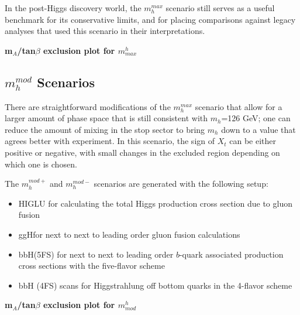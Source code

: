 In the post-Higgs discovery world, the $m_h^{max}$ scenario still serves as a useful
benchmark for its conservative limits, and for placing comparisons against legacy analyses
that used this scenario in their interpretations.   

\textbf{m$_A$/tan$\beta$ exclusion plot for $m^h_{max}$}


\subsection{$m_h^{mod}$ Scenarios}
There are straightforward modifications of the $m_h^{max}$ scenario that allow for 
a larger amount of phase space that is still consistent with $m_h$=126 GeV; one
can reduce the amount of mixing in the stop sector to bring $m_h$ down to a value
that agrees better with experiment.  In this scenario, the sign of $X_t$ can be either
positive or negative, with small changes in the excluded region depending on 
which one is chosen.

The $m_h^{mod+}$ and $m_h^{mod-}$ scenarios are generated with the following setup:
\begin{itemize}
    \item HIGLU for calculating the total Higgs production cross section due to gluon fusion \cite{higlu}
    \item ggH\@NNLO for next to next to leading order gluon fusion calculations \cite{gghnnlo} 
    \item bbH\@NNLO (5FS) for next to next to leading order $b$-quark associated production cross sections with the five-flavor scheme \cite{bbhnnlo}
    \item bbH (4FS) scans for Higgstrahlung off bottom quarks in the 4-flavor scheme \cite{bbh_4fs_1} \cite{bbh_4fs_2}
\end{itemize}

\textbf{m$_A$/tan$\beta$ exclusion plot for $m^h_{mod}$}





